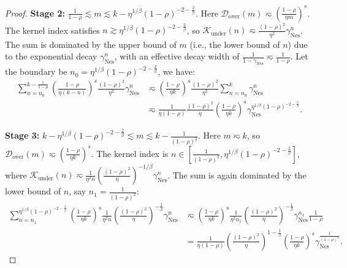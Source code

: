 \begin{proof}
\textbf{Stage 2:} $\frac{1}{1-\rho} \lesssim m \lesssim k - \eta^{1/\beta}(1-\rho)^{-2-\frac{2}{\beta}}$. 
Here $\mathcal{D}_{\mathrm{over}}(m) \eqsim \left(\frac{1-\rho}{\eta m}\right)^s$. The kernel index satisfies $n \gtrsim \eta^{1/\beta}(1-\rho)^{-2-\frac{2}{\beta}}$, so $\mathcal{K}_{\mathrm{under}}(n) \eqsim \frac{(1-\rho)^2}{\eta^2} \gamma_{\mathrm{Nes}}^n$. The sum is dominated by the upper bound of $m$ (i.e., the lower bound of $n$) due to the exponential decay $\gamma_{\mathrm{Nes}}^n$, with an effective decay width of $\frac{1}{1-\gamma_{\mathrm{Nes}}} \eqsim \frac{1}{1-\rho}$. Let the boundary be $n_0 = \eta^{1/\beta}(1-\rho)^{-2-\frac{2}{\beta}}$, we have:
\begin{align*}
    \sum_{n=n_0}^{k - \frac{1}{1-\rho}} \left(\frac{1-\rho}{\eta (k-n)}\right)^s \frac{(1-\rho)^2}{\eta^2} \gamma_{\mathrm{Nes}}^n 
    &\eqsim \left(\frac{1-\rho}{\eta k}\right)^s \frac{(1-\rho)^2}{\eta^2} \sum_{n=n_0}^{k} \gamma_{\mathrm{Nes}}^n \\
    &\eqsim \frac{1}{\eta(1-\rho)} \frac{(1-\rho)^2}{\eta} \left(\frac{1-\rho}{\eta k}\right)^s \gamma_{\mathrm{Nes}}^{\eta^{1/\beta}(1-\rho)^{-2-\frac{2}{\beta}}}.
\end{align*}

\textbf{Stage 3:} $k - \eta^{1/\beta}(1-\rho)^{-2-\frac{2}{\beta}} \lesssim m \lesssim k - \frac{1}{(1-\rho)^2}$. 
Here $m \eqsim k$, so $\mathcal{D}_{\mathrm{over}}(m) \eqsim \left(\frac{1-\rho}{\eta k}\right)^s$. The kernel index is $n \in \left[ \frac{1}{(1-\rho)^2}, \eta^{1/\beta}(1-\rho)^{-2-\frac{2}{\beta}} \right]$, where $\mathcal{K}_{\mathrm{under}}(n) \eqsim \frac{1}{\eta^2 n}\left(\frac{(1-\rho)^2}{\eta}\right)^{-1/\beta} \gamma_{\mathrm{Nes}}^n$. The sum is again dominated by the lower bound of $n$, say $n_1 = \frac{1}{(1-\rho)^2}$:
\begin{align*}
    \sum_{n=n_1}^{\eta^{1/\beta}(1-\rho)^{-2-\frac{2}{\beta}}} \left(\frac{1-\rho}{\eta k}\right)^s \frac{1}{\eta^2 n}\left(\frac{(1-\rho)^2}{\eta}\right)^{-\frac{1}{\beta}} \gamma_{\mathrm{Nes}}^n 
    &\eqsim \left(\frac{1-\rho}{\eta k}\right)^s \frac{1}{\eta^2 n_1} \left(\frac{(1-\rho)^2}{\eta}\right)^{-\frac{1}{\beta}} \gamma_{\mathrm{Nes}}^{n_1} \frac{1}{1-\rho} \\
    &= \frac{1}{\eta(1-\rho)} \left(\frac{(1-\rho)^2}{\eta}\right)^{1-\frac{1}{\beta}} \left(\frac{1-\rho}{\eta k}\right)^s \gamma_{\mathrm{Nes}}^{\frac{1}{(1-\rho)^2}}.
\end{align*}


\end{proof}
